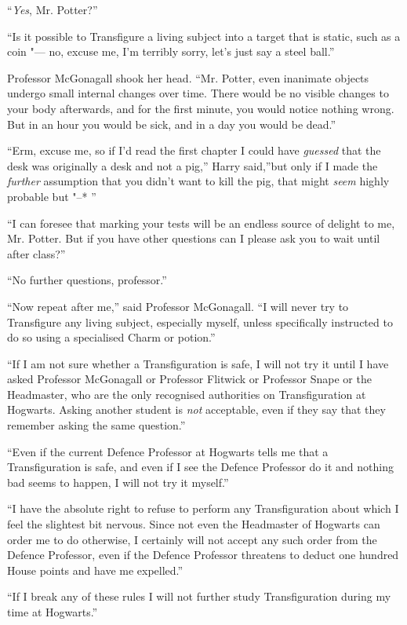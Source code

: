 ``\emph{Yes}, Mr. Potter?''

``Is it possible to Transfigure a living subject into a target that is
static, such as a coin "--- no, excuse me, I'm terribly sorry, let's just
say a steel ball.''

Professor McGonagall shook her head. ``Mr. Potter, even inanimate
objects undergo small internal changes over time. There would be no
visible changes to your body afterwards, and for the first minute, you
would notice nothing wrong. But in an hour you would be sick, and in a
day you would be dead.''

``Erm, excuse me, so if I'd read the first chapter I could have
\emph{guessed} that the desk was originally a desk and not a pig,''
Harry said,''but only if I made the \emph{further} assumption that you
didn't want to kill the pig, that might \emph{seem} highly probable but
"--* ''

``I can foresee that marking your tests will be an endless source of
delight to me, Mr. Potter. But if you have other questions can I please
ask you to wait until after class?''

``No further questions, professor.''

``Now repeat after me,'' said Professor McGonagall. ``I will never try
to Transfigure any living subject, especially myself, unless
specifically instructed to do so using a specialised Charm or potion.''

``If I am not sure whether a Transfiguration is safe, I will not try it
until I have asked Professor McGonagall or Professor Flitwick or
Professor Snape or the Headmaster, who are the only recognised
authorities on Transfiguration at Hogwarts. Asking another student is
\emph{not} acceptable, even if they say that they remember asking the
same question.''

``Even if the current Defence Professor at Hogwarts tells me that a
Transfiguration is safe, and even if I see the Defence Professor do it
and nothing bad seems to happen, I will not try it myself.''

``I have the absolute right to refuse to perform any Transfiguration
about which I feel the slightest bit nervous. Since not even the
Headmaster of Hogwarts can order me to do otherwise, I certainly will
not accept any such order from the Defence Professor, even if the
Defence Professor threatens to deduct one hundred House points and have
me expelled.''

``If I break any of these rules I will not further study Transfiguration
during my time at Hogwarts.''

